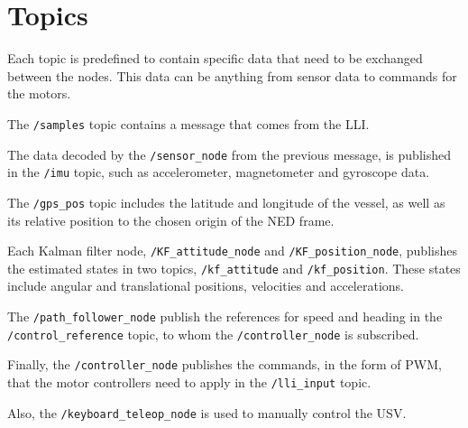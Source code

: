 \section{Topics}
Each topic is predefined to contain specific data that need to be exchanged between the nodes. This data can be anything from sensor data to commands for the motors.

The \lstinline[style=cinline]{/samples} topic contains a message that comes from the LLI.

The data decoded by the \lstinline[style=cinline]{/sensor_node} from the previous message, is published in the \lstinline[style=cinline]{/imu} topic, such as accelerometer, magnetometer and gyroscope data.

The \lstinline[style=cinline]{/gps_pos} topic includes the latitude and longitude of the vessel, as well as its relative position to the chosen origin of the NED frame.

Each Kalman filter node, \lstinline[style=cinline]{/KF_attitude_node} and \lstinline[style=cinline]{/KF_position_node}, publishes the estimated states in two topics, \lstinline[style=cinline]{/kf_attitude} and \lstinline[style=cinline]{/kf_position}. These states include angular and translational positions, velocities and accelerations.

The \lstinline[style=cinline]{/path_follower_node} publish the references for speed and heading in the \lstinline[style=cinline]{/control_reference} topic, to whom the \lstinline[style=cinline]{/controller_node} is subscribed.

Finally, the \lstinline[style=cinline]{/controller_node} publishes the commands, in the form of PWM, that the motor controllers need to apply in the \lstinline[style=cinline]{/lli_input} topic.

Also, the \lstinline[style=cinline]{/keyboard_teleop_node} is used to manually control the USV. 

